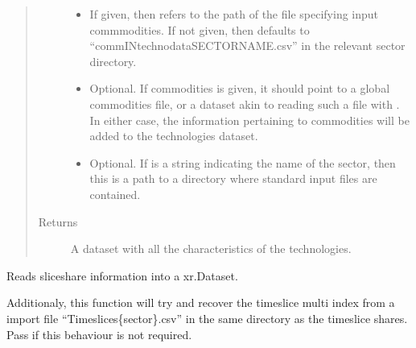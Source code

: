 \documentclass[letterpaper,10pt,english]{sphinxmanual}
\begin{document}
\begin{fulllineitems}
\begin{quote}
\begin{description}
\begin{itemize}
\item {} 
 \textendash{} If given, then refers to the path of the file specifying input
commmodities. If not given, then defaults to
“commINtechnodataSECTORNAME.csv” in the relevant sector directory.

\item {} 
 \textendash{} Optional. If commodities is given, it should point to a global
commodities file, or a dataset akin to reading such a file with
. In either case, the information pertaining to
commodities will be added to the technologies dataset.

\item {} 
 \textendash{} Optional. If  is a string indicating the
name of the sector, then this is a path to a directory where standard input
files are contained.

\end{itemize}

\item[{Returns}] \leavevmode
A dataset with all the characteristics of the technologies.

\end{description}\end{quote}

\end{fulllineitems}


\begin{fulllineitems}
\label{\detokenize{api:muse.readers.csv.read_timeslice_shares}}
Reads sliceshare information into a xr.Dataset.

Additionaly, this function will try and recover the timeslice multi\sphinxhyphen{} index from a
import file “Timeslices\{sector\}.csv” in the same directory as the timeslice shares.
Pass  if this behaviour is not required.

\end{fulllineitems}
\end{document}
